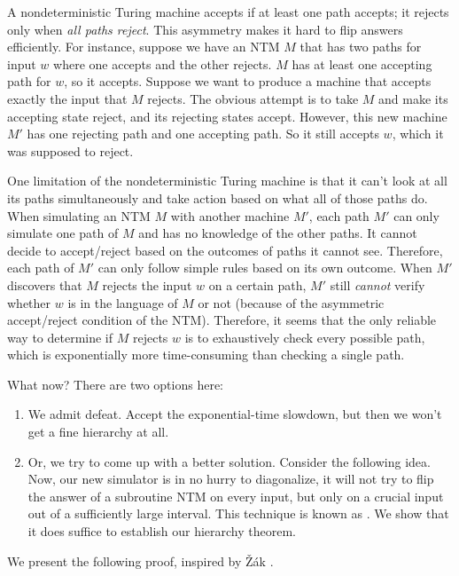 A nondeterministic Turing machine accepts if at least one path accepts; it rejects only when \emph{all paths reject}. This asymmetry makes it hard to flip answers efficiently. For instance, suppose we have an NTM $M$ that has two paths for input $w$ where one accepts and the other rejects. $M$ has at least one accepting path for $w$, so it accepts. Suppose we want to produce a machine that accepts exactly the input that $M$ rejects. The obvious attempt is to take $M$ and make its accepting state reject, and its rejecting states accept. However, this new machine $M'$ has one rejecting path and one accepting path. So it still accepts $w$, which it was supposed to reject.

One limitation of the nondeterministic Turing machine is that it can't look at all its paths simultaneously and take action based on what all of those paths do. When simulating an NTM $M$ with another machine $M'$, each path $M'$ can only simulate one path of $M$ and has no knowledge of the other paths. It cannot decide to accept/reject based on the outcomes of paths it cannot see. Therefore, each path of $M'$ can only follow simple rules based on its own outcome. When $M'$ discovers that $M$ rejects the input $w$ on a certain path, $M'$ still \emph{cannot} verify whether $w$ is in the language of $M$ or not (because of the asymmetric accept/reject condition of the NTM). Therefore, it seems that the only reliable way to determine if $M$ rejects $w$ is to exhaustively check every possible path, which is exponentially more time-consuming than checking a single path.

What now? There are two options here:
\begin{enumerate}
  \item We admit defeat. Accept the exponential-time slowdown, but then we won't get a fine hierarchy at all.
  \item Or, we try to come up with a better solution. Consider the following idea. Now, our new simulator is in no hurry to diagonalize, it will not try to flip the answer of a subroutine NTM on every input, but only on a crucial input out of a sufficiently large interval. This technique is known as . We show that it does suffice to establish our hierarchy theorem.
\end{enumerate}

We present the following proof, inspired by Žák \cite{zak1983turing}.

